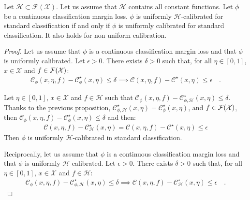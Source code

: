 \begin{prop*}
Let $\mathcal{H}\subset \mathcal{F}(\mathcal{X})$. Let us assume that $\mathcal{H}$ contains all constant functions. Let $\phi$ be a continuous classification margin loss.  $\phi$ is uniformly $\mathcal{H}$-calibrated for standard classification if and only if  $\phi$ is uniformly calibrated for standard classification. It also holds for non-uniform calibration.
\end{prop*}
\begin{proof}
Let us assume that $\phi$ is a continuous classification margin loss and that $\phi$ is uniformly calibrated. Let $\epsilon>0$. There exists $\delta>0$ such that, for all $\eta\in[0,1]$, $x\in\mathcal{X}$ and $f\in\mathcal{F}(\mathcal{X})$:
\begin{align*}
    \mathcal{C}_{\phi}(x,\eta,f)- \mathcal{C}^\star_{\phi}(x,\eta)\leq\delta\implies\mathcal{C}(x,\eta,f)- \mathcal{C}^\star(x,\eta)\leq \epsilon\quad.
\end{align*}

Let $\eta\in[0,1]$, $x\in\mathcal{X}$ and $f\in\mathcal{H}$ such that $ \mathcal{C}_{\phi}(x,\eta,f)- \mathcal{C}^\star_{\phi,\mathcal{H}}(x,\eta)\leq\delta$. Thanks to the previous proposition, $\mathcal{C}^\star_{\phi,\mathcal{H}}(x,\eta)=\mathcal{C}^\star_{\phi}(x,\eta)$, and $f\in\mathcal{F}(\mathcal{X})$, then $\mathcal{C}_{\phi}(x,\eta,f)- \mathcal{C}^\star_{\phi}(x,\eta)\leq\delta$ and  then:
\begin{align*}
    \mathcal{C}(x,\eta,f)- \mathcal{C}^\star_{\mathcal{H}}(x,\eta) =  \mathcal{C}(x,\eta,f)- \mathcal{C}^\star(x,\eta) \leq\epsilon
\end{align*}
Then $\phi$ is uniformly $\mathcal{H}$-calibrated in standard classification.

Reciprocally, let us assume that $\phi$ is a continuous classification margin loss and that $\phi$ is uniformly $\mathcal{H}$-calibrated. Let $\epsilon>0$. There exists $\delta>0$ such that, for all $\eta\in[0,1]$, $x\in\mathcal{X}$ and $f\in\mathcal{H}$:
\begin{align*}
    \mathcal{C}_{\phi}(x,\eta,f)- \mathcal{C}^\star_{\phi,\mathcal{H}}(x,\eta)\leq\delta\implies\mathcal{C}(x,\eta,f)- \mathcal{C}^\star_\mathcal{H}(x,\eta)\leq \epsilon\quad.
\end{align*}



\end{proof}

